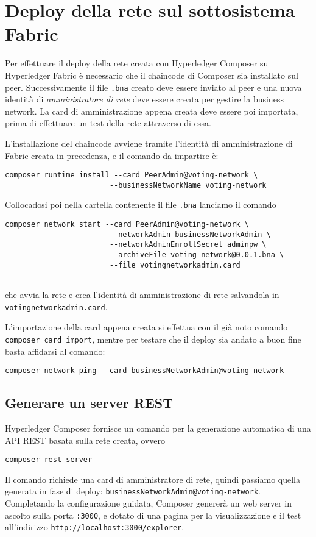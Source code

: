 \section{Deploy della rete sul sottosistema Fabric}
	Per effettuare il deploy della rete creata con Hyperledger Composer su Hyperledger Fabric è necessario che il chaincode di Composer sia installato sul peer. Successivamente il file \lstinline{.bna} creato deve essere inviato al peer e una nuova identità di \emph{amministratore di rete} deve essere creata per gestire la business network. La card di amministrazione appena creata deve essere poi importata, prima di effettuare un test della rete attraverso di essa. 
	
	L'installazione del chaincode avviene tramite l'identità di amministrazione di Fabric creata in precedenza, e il comando da impartire è:
\begin{lstlisting}
composer runtime install --card PeerAdmin@voting-network \
						--businessNetworkName voting-network

\end{lstlisting}
	
	Collocadosi poi nella cartella contenente il file \lstinline{.bna} lanciamo il comando 
\begin{lstlisting}
composer network start --card PeerAdmin@voting-network \
						--networkAdmin businessNetworkAdmin \
						--networkAdminEnrollSecret adminpw \
						--archiveFile voting-network@0.0.1.bna \
						--file votingnetworkadmin.card
						
\end{lstlisting}
	che avvia la rete e crea l'identità di amministrazione di rete salvandola in \lstinline{votingnetworkadmin.card}.
	
	L'importazione della card appena creata si effettua con il già noto comando \lstinline{composer card import}, mentre per testare che il deploy sia andato a buon fine basta affidarsi al comando:
\begin{lstlisting}
composer network ping --card businessNetworkAdmin@voting-network

\end{lstlisting}
	
	\subsection{Generare un server REST}
		Hyperledger Composer fornisce un comando per la generazione automatica di una API REST basata sulla rete creata, ovvero
\begin{lstlisting}
composer-rest-server

\end{lstlisting}
	Il comando richiede una card di amministratore di rete, quindi passiamo quella generata in fase di deploy: \lstinline{businessNetworkAdmin@voting-network}. Completando la configurazione guidata, Composer genererà un web server in ascolto sulla porta \lstinline{:3000}, e dotato di una pagina per la visualizzazione e il test all'indirizzo \lstinline{http://localhost:3000/explorer}.
